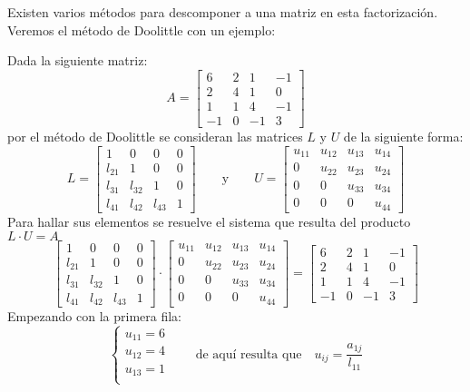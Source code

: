 Existen varios métodos para descomponer a una matriz en esta factorización. Veremos el método de Doolittle con un ejemplo:

\ejemplo Dada la siguiente matriz:
\[
  A = \begin{bmatrix}
    6 & 2 & 1 & -1 \\
    2 & 4 & 1 & 0 \\
    1 & 1 & 4 & -1 \\
    -1 & 0 & -1 & 3
  \end{bmatrix}
\]
por el método de Doolittle se consideran las matrices \(L\) y \(U\) de la siguiente forma:
\[
L = \begin{bmatrix}
  1 & 0 & 0 & 0 \\
  l_{21} & 1 & 0 & 0 \\
  l_{31} & l_{32} & 1 & 0 \\
  l_{41} & l_{42} & l_{43} & 1
\end{bmatrix} \qquad \text{y} \qquad U = \begin{bmatrix}
  u_{11} & u_{12} & u_{13} & u_{14} \\
  0 & u_{22} & u_{23} & u_{24} \\
  0 & 0 & u_{33} & u_{34} \\
  0 & 0 & 0 & u_{44}
\end{bmatrix}
\]
Para hallar sus elementos se resuelve el sistema que resulta del producto \(L\cdot U = A\)
\[
\begin{bmatrix}
  1 & 0 & 0 & 0 \\
  l_{21} & 1 & 0 & 0 \\
  l_{31} & l_{32} & 1 & 0 \\
  l_{41} & l_{42} & l_{43} & 1
\end{bmatrix} \cdot \begin{bmatrix}
  u_{11} & u_{12} & u_{13} & u_{14} \\
  0 & u_{22} & u_{23} & u_{24} \\
  0 & 0 & u_{33} & u_{34} \\
  0 & 0 & 0 & u_{44}
\end{bmatrix} = \begin{bmatrix}
    6 & 2 & 1 & -1 \\
    2 & 4 & 1 & 0 \\
    1 & 1 & 4 & -1 \\
    -1 & 0 & -1 & 3
  \end{bmatrix}
\]
Empezando con la primera fila:
\[
\begin{cases}
  u_{11} = 6 \\
  u_{12} = 4 \\ 
  u_{13} = 1 \\
\end{cases} \qquad \text{de aquí resulta que} \quad u_{ij} = \frac{a_{1j}}{l_{11}}
\]
